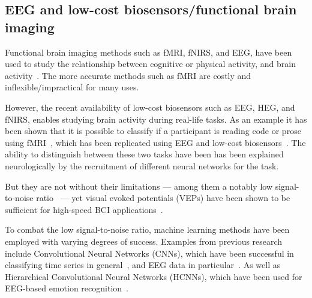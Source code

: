 \documentclass[a4paper]{article}
\begin{document}
\begin{refsection}

\subsection{EEG and low-cost biosensors/functional brain imaging}

    Functional brain imaging methods such as fMRI, fNIRS, and EEG, have been used to study the relationship between cognitive or physical activity, and brain activity~\cite{floyd_decoding_2017}\cite{hong_classification_2015}\cite{fucci_replication_2019}. The more accurate methods such as fMRI are costly and inflexible/impractical for many uses.

    However, the recent availability of low-cost biosensors such as EEG, HEG, and fNIRS, enables studying brain activity during real-life tasks. As an example it has been shown that it is possible to classify if a participant is reading code or prose using fMRI~\cite{floyd_decoding_2017}, which has been replicated using EEG and low-cost biosensors~\cite{fucci_replication_2019}. The ability to distinguish between these two tasks have been has been explained neurologically by the recruitment of different neural networks  for the task. 

    But they are not without their limitations --- among them a notably low signal-to-noise ratio~\cite{mcfarland_eeg-based_2017} --- yet visual evoked potentials (VEPs) have been shown to be sufficient for high-speed BCI applications~\cite{spuler_high-speed_2017}.

    To combat the low signal-to-noise ratio, machine learning methods have been employed with varying degrees of success. Examples from previous research include Convolutional Neural Networks (CNNs), which have been successful in classifying time series in general~\cite{zhao_convolutional_2017}, and EEG data in particular~\cite{schirrmeister_deep_2017}. As well as Hierarchical Convolutional Neural Networks (HCNNs), which have been used for EEG-based emotion recognition~\cite{li_hierarchical_2018}.





\end{refsection}
\end{document}
